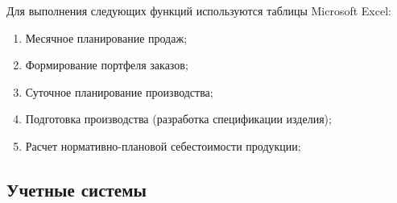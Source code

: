 Для выполнения следующих функций используются таблицы Microsoft Excel:
\begin{enumerate}
 \item Месячное планирование продаж;
\item Формирование портфеля заказов;
\item Суточное планирование производства;
\item Подготовка производства (разработка спецификации изделия);
\item Расчет нормативно-плановой себестоимости продукции;
\end{enumerate}





\subsection{Учетные системы}

